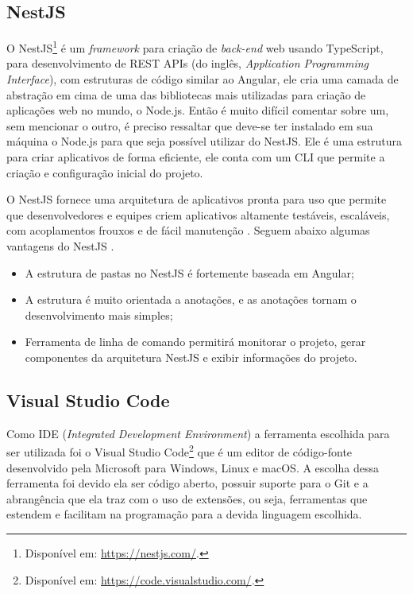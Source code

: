 \subsection{NestJS}
\label{ssec:NestJS}
O NestJS\footnote{Disponível em: \url{https://nestjs.com/}.} é um \textit{framework} para criação de \textit{back-end} web usando TypeScript, para desenvolvimento de REST APIs (do inglês, \textit{Application Programming Interface}), com estruturas de código similar ao Angular, ele cria uma camada de abstração em cima de uma das bibliotecas mais utilizadas para criação de aplicações web no mundo, o Node.js.  Então é muito difícil comentar sobre um, sem mencionar o outro, é preciso ressaltar que deve-se ter instalado em sua máquina o Node.js para que seja possível utilizar do NestJS. Ele é uma estrutura para criar aplicativos de forma eficiente, ele conta com um CLI que permite a criação e configuração inicial do projeto.

O NestJS fornece uma arquitetura de aplicativos pronta para uso que permite que desenvolvedores e equipes criem aplicativos altamente testáveis, escaláveis, com acoplamentos frouxos e de fácil manutenção \cite{kamil2020nestjs}. Seguem abaixo algumas vantagens do NestJS .

\begin{itemize}
    \item A estrutura de pastas no NestJS é fortemente baseada em Angular; 
    \item A estrutura é muito orientada a anotações, e as anotações tornam o desenvolvimento mais simples;   
    \item Ferramenta de linha de comando permitirá monitorar o projeto, gerar componentes da arquitetura NestJS e exibir informações do projeto.
\end{itemize}

\subsection{Visual Studio Code}
\label{ssec:VSCode}
Como IDE (\textit{Integrated Development Environment}) a ferramenta escolhida para ser utilizada foi o Visual Studio Code\footnote{Disponível em: \url{https://code.visualstudio.com/}.} que é um editor de código-fonte desenvolvido pela Microsoft para Windows, Linux e macOS. A escolha dessa ferramenta foi devido ela ser código aberto, possuir suporte para o Git e a abrangência que ela traz com o uso de extensões, ou seja, ferramentas que estendem e facilitam na programação para a devida linguagem escolhida.

